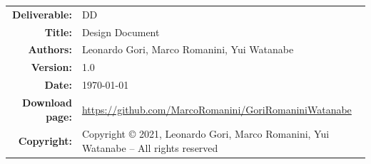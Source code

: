 


\begin{table}[H]
    \setlength\arrayrulewidth{1pt}
    \centering
    \begin{tabular}{rl}
        \hline
        \textbf{Deliverable:} & DD\\
        \textbf{Title:} & Design Document \\
        \textbf{Authors:} & Leonardo Gori, Marco Romanini, Yui Watanabe \\
        \textbf{Version:} & 1.0 \\ 
        \textbf{Date:} & \today \\
        \textbf{Download page:} & \url{https://github.com/MarcoRomanini/GoriRomaniniWatanabe} \\
        \textbf{Copyright:} & Copyright © 2021, Leonardo Gori, Marco Romanini, Yui Watanabe – All rights reserved \\
        \hline
    \end{tabular}
\end{table}

\setcounter{page}{2}


\newpage
{}
\tableofcontents
\newpage
{}
\listoffigures
{}
\listoftables

